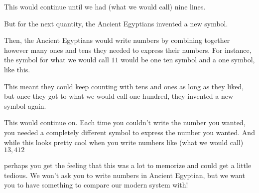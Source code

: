 \documentclass{ximera}
\begin{document}
This would continue until we had (what we would call) nine lines.

\begin{center}
\textpmhg{\HZi\HZi\HZi\HZi\HZi\HZi\HZi\HZi\HZi}
\end{center}

But for the next quantity, the Ancient Egyptians invented a new symbol.

\begin{center}
\end{center}


Then, the Ancient Egyptians would write numbers by combining together however many ones and tens they needed to express their numbers. For instance, the symbol for what we would call $11$ would be one ten symbol and a one symbol, like this.

\begin{center}
\end{center}

 This meant they could keep counting with tens and ones as long as they liked, but once they got to what we would call one hundred, they invented a new symbol again.

\begin{center}
\end{center}

This would continue on. Each time you couldn't write the number you wanted, you needed a completely different symbol to express the number you wanted. And while this looks pretty cool when you write numbers like (what we would call) $13,412$

\begin{center}
\end{center}

perhaps you get the feeling that this was a lot to memorize and could get a little tedious. We won't ask you to write numbers in Ancient Egyptian, but we want you to have something to compare our modern system with!
\end{document}
